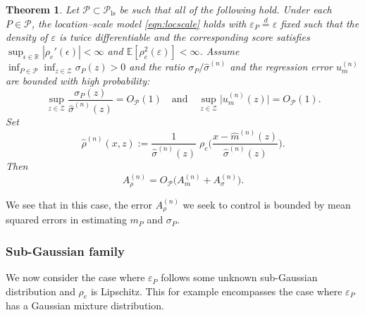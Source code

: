 \documentclass[aos]{imsart}
\newcommand{\R}{\mathbb{R}}
\newcommand{\E}{\mathbb{E}}
\newtheorem{theorem}{Theorem}
\begin{document}
	\begin{theorem}
		\label{thm:knownscoreestimation}
		Let $\mathcal{P}\subset\mathcal{P}_{\text{ls}}$ be such that all of the following hold. Under each $P\in\mathcal{P}$, the location--scale model \eqref{eqn:locscale} holds with $\varepsilon_P \overset{d}{=} \varepsilon$ fixed such that the density of $\varepsilon$ is twice differentiable 
	and the corresponding score satisfies $\sup_{\epsilon\in\R} |\rho_{e}'(\epsilon)| < \infty$ and $\E[\rho_{e}^2(\varepsilon)]<\infty$.
		Assume $\inf_{P\in\mathcal{P}} \inf_{z\in\mathcal Z} \sigma_P(z)>0$
		and the ratio $\sigma_P / \hat\sigma^{(n)}$ and the regression error $u_m^{(n)}$ are bounded with high probability:
		\begin{equation} \label{eq:sigma_m_cond}
			\sup_{z\in\mathcal Z}\frac{\sigma_P(z)}{\hat\sigma^{(n)}(z)} = O_{\mathcal{P}}(1)  \quad \text{and} \quad \sup_{z\in\mathcal Z}\big|u_m^{(n)}(z)\big| = O_{\mathcal{P}}(1).
		\end{equation} 
		Set 
		\begin{equation*}
			\hat\rho^{(n)}(x,z) := \frac{1}{\hat \sigma^{(n)}(z)}\; \rho_{e}\bigg(\frac{x-\hat m^{(n)}(z)}{\hat\sigma^{(n)}(z)}\bigg).
		\end{equation*}
		Then \begin{equation*}
			A_\rho^{(n)} = O_{\mathcal{P}}\big(A_m^{(n)} + A_\sigma^{(n)}\big).
		\end{equation*}
	\end{theorem}
We see that in this case, the error $A_\rho^{(n)}$ we seek to control is bounded by mean squared errors in estimating $m_P$ and $\sigma_P$.
	
	
	\subsubsection{Sub-Gaussian family}
	\label{sect:subgscoreestimation}
	
	We now consider the case where $\varepsilon_P$ follows some unknown sub-Gaussian distribution and $\rho_{e}$ is Lipschitz. This for example encompasses the case where $\varepsilon_P$ has a Gaussian mixture distribution.
	
\end{document}
